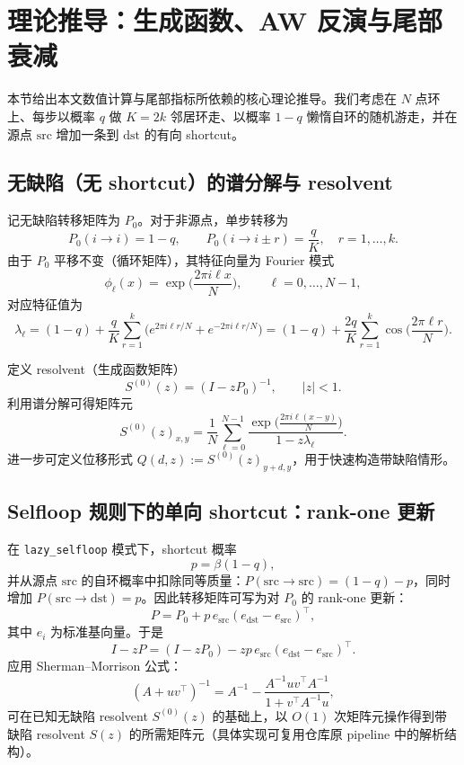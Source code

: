 \section{理论推导：生成函数、AW 反演与尾部衰减}

本节给出本文数值计算与尾部指标所依赖的核心理论推导。我们考虑在 $N$ 点环上、每步以概率 $q$ 做 $K=2k$ 邻居环走、以概率 $1-q$ 懒惰自环的随机游走，并在源点 $\mathrm{src}$ 增加一条到 $\mathrm{dst}$ 的有向 shortcut。

\subsection{无缺陷（无 shortcut）的谱分解与 resolvent}
记无缺陷转移矩阵为 $P_0$。对于非源点，单步转移为
\[
P_0(i\to i)=1-q,\qquad
P_0(i\to i\pm r)=\frac{q}{K},\quad r=1,\dots,k.
\]
由于 $P_0$ 平移不变（循环矩阵），其特征向量为 Fourier 模式
\[
\phi_\ell(x)=\exp\Big(\frac{2\pi i\ell x}{N}\Big),\qquad \ell=0,\dots,N-1,
\]
对应特征值为
\begin{equation}
\lambda_\ell
=(1-q)+\frac{q}{K}\sum_{r=1}^{k}\Big(e^{2\pi i\ell r/N}+e^{-2\pi i\ell r/N}\Big)
=(1-q)+\frac{2q}{K}\sum_{r=1}^{k}\cos\Big(\frac{2\pi \ell r}{N}\Big).
\end{equation}

定义 resolvent（生成函数矩阵）
\[
S^{(0)}(z)=(I-zP_0)^{-1},\qquad |z|<1.
\]
利用谱分解可得矩阵元
\begin{equation}
S^{(0)}(z)_{x,y}
=\frac{1}{N}\sum_{\ell=0}^{N-1}
\frac{\exp\Big(\frac{2\pi i\ell(x-y)}{N}\Big)}{1-z\lambda_\ell}.
\end{equation}
进一步可定义位移形式 $Q(d,z):=S^{(0)}(z)_{y+d,y}$，用于快速构造带缺陷情形。

\subsection{Selfloop 规则下的单向 shortcut：rank-one 更新}
在 \texttt{lazy\_selfloop} 模式下，shortcut 概率
\[
p=\beta(1-q),
\]
并从源点 $\mathrm{src}$ 的自环概率中扣除同等质量：$P(\mathrm{src}\to\mathrm{src})=(1-q)-p$，同时增加 $P(\mathrm{src}\to\mathrm{dst})=p$。因此转移矩阵可写为对 $P_0$ 的 rank-one 更新：
\begin{equation}
P = P_0 + p\, e_{\mathrm{src}}(e_{\mathrm{dst}}-e_{\mathrm{src}})^\top,
\end{equation}
其中 $e_i$ 为标准基向量。于是
\[
I-zP = (I-zP_0) - z p\, e_{\mathrm{src}}(e_{\mathrm{dst}}-e_{\mathrm{src}})^\top.
\]
应用 Sherman--Morrison 公式：
\[
(A+uv^\top)^{-1}=A^{-1}-\frac{A^{-1}uv^\top A^{-1}}{1+v^\top A^{-1}u},
\]
可在已知无缺陷 resolvent $S^{(0)}(z)$ 的基础上，以 $O(1)$ 次矩阵元操作得到带缺陷 resolvent $S(z)$ 的所需矩阵元（具体实现可复用仓库原 pipeline 中的解析结构）。

